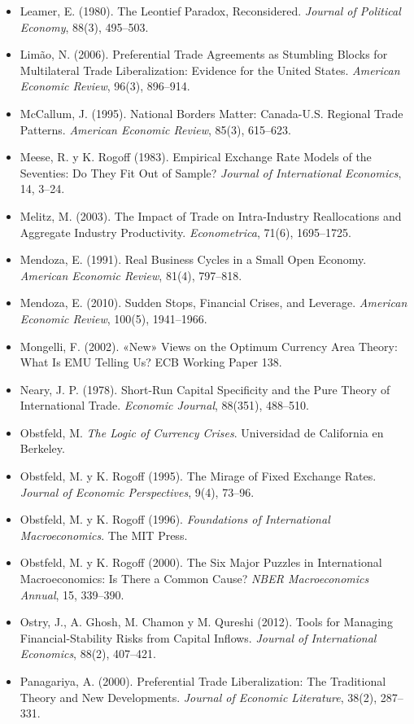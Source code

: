 \documentclass[11pt,a4paper]{article}
\begin{document}
{\begin{itemize}[leftmargin=1.4em,itemsep=1pt,label={}]
\item Leamer, E. (1980). The Leontief Paradox, Reconsidered. \emph{Journal of Political Economy}, 88(3), 495--503.
\item Limão, N. (2006). Preferential Trade Agreements as Stumbling Blocks for Multilateral Trade Liberalization: Evidence for the United States. \emph{American Economic Review}, 96(3), 896--914.
\item McCallum, J. (1995). National Borders Matter: Canada-U.S. Regional Trade Patterns. \emph{American Economic Review}, 85(3), 615--623.
\item Meese, R. y K. Rogoff (1983). Empirical Exchange Rate Models of the Seventies: Do They Fit Out of Sample? \emph{Journal of International Economics}, 14, 3--24.
\item Melitz, M. (2003). The Impact of Trade on Intra-Industry Reallocations and Aggregate Industry Productivity. \emph{Econometrica}, 71(6), 1695--1725.
\item Mendoza, E. (1991). Real Business Cycles in a Small Open Economy. \emph{American Economic Review}, 81(4), 797--818.
\item Mendoza, E. (2010). Sudden Stops, Financial Crises, and Leverage. \emph{American Economic Review}, 100(5), 1941--1966.
\item Mongelli, F. (2002). «New» Views on the Optimum Currency Area Theory: What Is EMU Telling Us? ECB Working Paper 138.
\item Neary, J. P. (1978). Short-Run Capital Specificity and the Pure Theory of International Trade. \emph{Economic Journal}, 88(351), 488--510.
\item Obstfeld, M. \emph{The Logic of Currency Crises}. Universidad de California en Berkeley.
\item Obstfeld, M. y K. Rogoff (1995). The Mirage of Fixed Exchange Rates. \emph{Journal of Economic Perspectives}, 9(4), 73--96.
\item Obstfeld, M. y K. Rogoff (1996). \emph{Foundations of International Macroeconomics}. The MIT Press.
\item Obstfeld, M. y K. Rogoff (2000). The Six Major Puzzles in International Macroeconomics: Is There a Common Cause? \emph{NBER Macroeconomics Annual}, 15, 339--390.
\item Ostry, J., A. Ghosh, M. Chamon y M. Qureshi (2012). Tools for Managing Financial-Stability Risks from Capital Inflows. \emph{Journal of International Economics}, 88(2), 407--421.
\item Panagariya, A. (2000). Preferential Trade Liberalization: The Traditional Theory and New Developments. \emph{Journal of Economic Literature}, 38(2), 287--331.

\end{itemize}}
\end{document}

